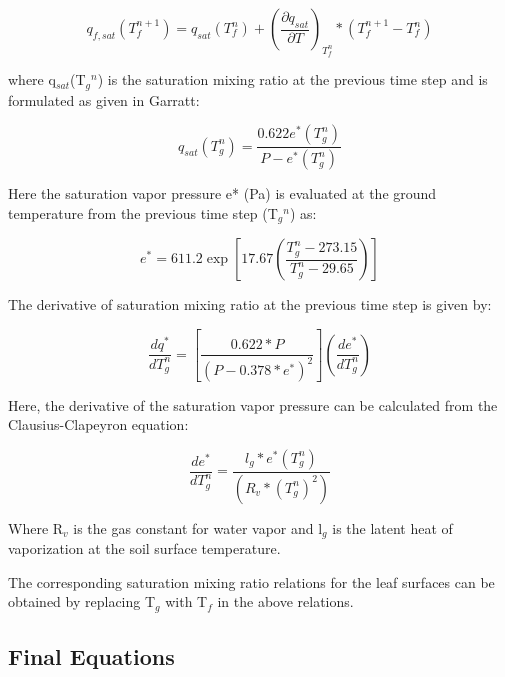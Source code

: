 \begin{equation}
{q_{f,sat}}\left( {T_f^{n + 1}} \right) = {q_{sat}}\left( {T_f^n} \right) + {\left( {\frac{{\partial {q_{sat}}}}{{\partial T}}} \right)_{T_f^n}} * \left( {T_f^{n + 1} - T_f^n} \right)
\end{equation}

where q\(_{sat}\)(T\(_{g}\)\(^{n}\)) is the saturation mixing ratio at the previous time step and is formulated as given in Garratt:

\begin{equation}
{q_{sat}}\left( {T_g^n} \right) = \frac{{0.622{e^ * }\left( {T_g^n} \right)}}{{P - {e^ * }\left( {T_g^n} \right)}}
\end{equation}

Here the saturation vapor pressure e* (Pa) is evaluated at the ground temperature from the previous time step (T\(_{g}\)\(^{n}\)) as:

\begin{equation}
{e^*} = 611.2\exp \left[ {17.67\left( {\frac{{T_g^n - 273.15}}{{T_g^n - 29.65}}} \right)} \right]
\end{equation}

The derivative of saturation mixing ratio at the previous time step is given by:

\begin{equation}
\frac{{d{q^ * }}}{{dT_g^n}} = \left[ {\frac{{0.622 * P}}{{{{\left( {P - 0.378 * {e^ * }} \right)}^2}}}} \right]\left( {\frac{{d{e^ * }}}{{dT_g^n}}} \right)
\end{equation}

Here, the derivative of the saturation vapor pressure can be calculated from the Clausius-Clapeyron equation:

\begin{equation}
\frac{{d{e^ * }}}{{dT_g^n}} = \frac{{{l_g} * {e^ * }\left( {T_g^n} \right)}}{{\left( {{R_v} * {{\left( {T_g^n} \right)}^2}} \right)}}
\end{equation}

Where R\(_{v}\) is the gas constant for water vapor and l\(_{g}\) is the latent heat of vaporization at the soil surface temperature.

The corresponding saturation mixing ratio relations for the leaf surfaces can be obtained by replacing T\(_{g}\) with T\(_{f}\) in the above relations.

\subsection{Final Equations}\label{final-equations}

